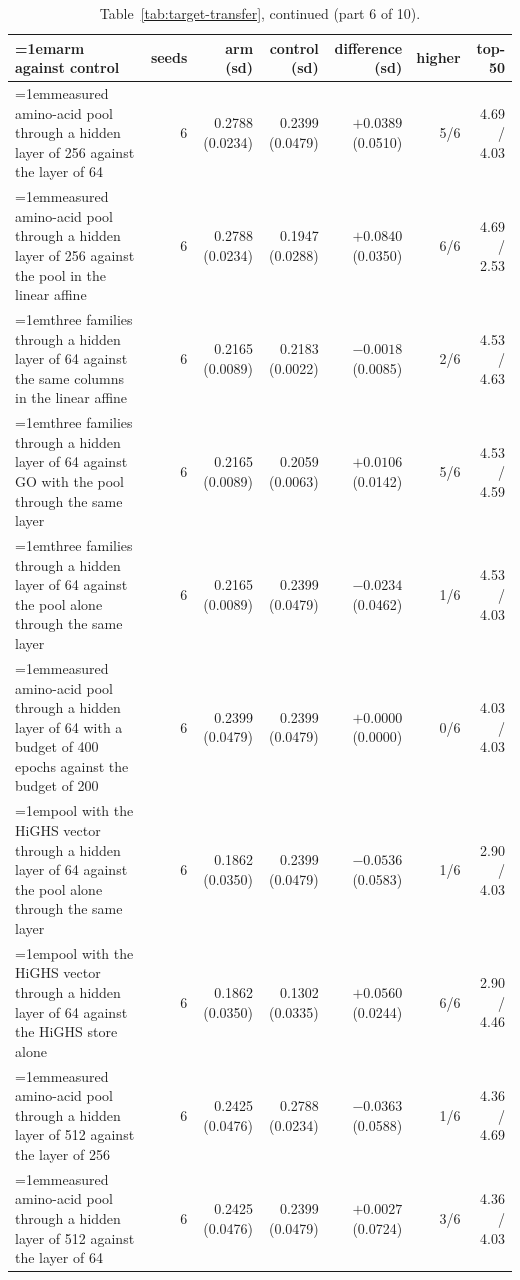 \begin{table}[H]
  \centering
  \footnotesize
  \setlength{\tabcolsep}{2.5pt}
  \caption[The rounds on betaxanthin: arm against control, continued]{Table~\ref{tab:target-transfer}, continued (part 6 of 10).}
  \label{tab:target-transfer-6}
  \begin{tabular}{@{}>{\raggedright\hangindent=1em\hangafter=1\arraybackslash}p{78.5mm}rrrrrr@{}}
    \hline
    arm against control & seeds & arm (sd) & control (sd) & difference (sd) & higher & top-50 \\
    \hline
    measured amino-acid pool through a hidden layer of 256 against the layer of 64 & 6 & 0.2788 (0.0234) & 0.2399 (0.0479) & $+0.0389$ (0.0510) & 5/6 & 4.69 / 4.03 \\
    measured amino-acid pool through a hidden layer of 256 against the pool in the linear affine & 6 & 0.2788 (0.0234) & 0.1947 (0.0288) & $+0.0840$ (0.0350) & 6/6 & 4.69 / 2.53 \\
    three families through a hidden layer of 64 against the same columns in the linear affine & 6 & 0.2165 (0.0089) & 0.2183 (0.0022) & $-0.0018$ (0.0085) & 2/6 & 4.53 / 4.63 \\
    three families through a hidden layer of 64 against GO with the pool through the same layer & 6 & 0.2165 (0.0089) & 0.2059 (0.0063) & $+0.0106$ (0.0142) & 5/6 & 4.53 / 4.59 \\
    three families through a hidden layer of 64 against the pool alone through the same layer & 6 & 0.2165 (0.0089) & 0.2399 (0.0479) & $-0.0234$ (0.0462) & 1/6 & 4.53 / 4.03 \\
    measured amino-acid pool through a hidden layer of 64 with a budget of 400 epochs against the budget of 200 & 6 & 0.2399 (0.0479) & 0.2399 (0.0479) & $+0.0000$ (0.0000) & 0/6 & 4.03 / 4.03 \\
    pool with the HiGHS vector through a hidden layer of 64 against the pool alone through the same layer & 6 & 0.1862 (0.0350) & 0.2399 (0.0479) & $-0.0536$ (0.0583) & 1/6 & 2.90 / 4.03 \\
    pool with the HiGHS vector through a hidden layer of 64 against the HiGHS store alone & 6 & 0.1862 (0.0350) & 0.1302 (0.0335) & $+0.0560$ (0.0244) & 6/6 & 2.90 / 4.46 \\
    measured amino-acid pool through a hidden layer of 512 against the layer of 256 & 6 & 0.2425 (0.0476) & 0.2788 (0.0234) & $-0.0363$ (0.0588) & 1/6 & 4.36 / 4.69 \\
    measured amino-acid pool through a hidden layer of 512 against the layer of 64 & 6 & 0.2425 (0.0476) & 0.2399 (0.0479) & $+0.0027$ (0.0724) & 3/6 & 4.36 / 4.03 \\

\end{tabular}
\end{table}
